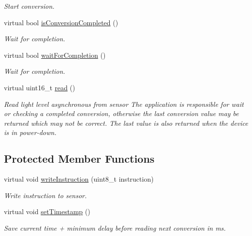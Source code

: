 \begin{DoxyCompactItemize}
\begin{DoxyCompactList}\small\item\em Start conversion. \end{DoxyCompactList}\item 
virtual bool \hyperlink{class_b_h1750_a97ec98f0a977395e8b1abf38603ff729}{is\+Conversion\+Completed} ()
\begin{DoxyCompactList}\small\item\em Wait for completion. \end{DoxyCompactList}\item 
virtual bool \hyperlink{class_b_h1750_a11f03719a00c091f83e8b8390157a3d6}{wait\+For\+Completion} ()
\begin{DoxyCompactList}\small\item\em Wait for completion. \end{DoxyCompactList}\item 
virtual uint16\+\_\+t \hyperlink{class_b_h1750_a80427aaebb649831d0373eebb9687be4}{read} ()
\begin{DoxyCompactList}\small\item\em Read light level asynchronous from sensor The application is responsible for wait or checking a completed conversion, otherwise the last conversion value may be returned which may not be correct. The last value is also returned when the device is in power-\/down. \end{DoxyCompactList}\end{DoxyCompactItemize}
\subsection*{Protected Member Functions}
\begin{DoxyCompactItemize}
\item 
virtual void \hyperlink{class_b_h1750_aa1a6679e85a27dbe31793c8507a8d2ae}{write\+Instruction} (uint8\+\_\+t instruction)
\begin{DoxyCompactList}\small\item\em Write instruction to sensor. \end{DoxyCompactList}\item 
virtual void \hyperlink{class_b_h1750_a0757c8a33ec1ba56e9b2ba8d79c1ff50}{set\+Timestamp} ()\hypertarget{class_b_h1750_a0757c8a33ec1ba56e9b2ba8d79c1ff50}{}\label{class_b_h1750_a0757c8a33ec1ba56e9b2ba8d79c1ff50}

\begin{DoxyCompactList}\small\item\em Save current time + minimum delay before reading next conversion in ms. \end{DoxyCompactList}\end{DoxyCompactItemize}


